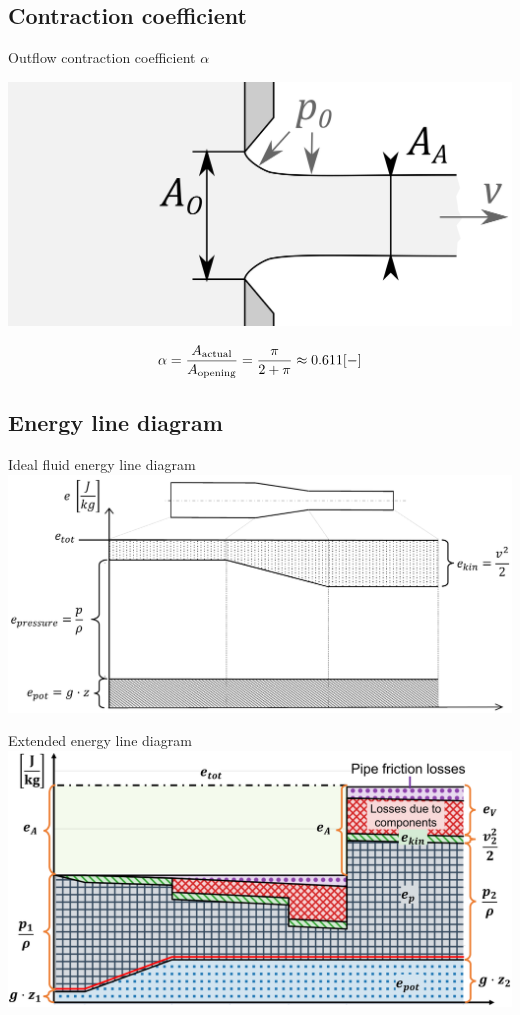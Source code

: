 \documentclass{article}
\begin{document}
\begin{multicols}{2}
\subsection{Contraction coefficient}
\begin{theorybox}{Outflow contraction coefficient $\alpha$}
    \begin{center}
        \includegraphics[width=.75\textwidth]{media/contraction.png}
    \end{center}
    \begin{equation}
        \alpha = \dfrac{A_{\rm actual}}{A_{\rm opening}} = \dfrac{\pi}{2 + \pi} \approx 0.611 [-]
    \end{equation}
\end{theorybox}

\subsection{Energy line diagram}
\begin{theorybox}{Ideal fluid energy line diagram}
    \includegraphics[width=\textwidth]{media/EGL_Duese_EN.PNG}
\end{theorybox}

\begin{theorybox}{Extended energy line diagram}
    \includegraphics[width=\textwidth]{media/04_energyLineDiagram_vGB.png}
\end{theorybox}

\vfill
\end{multicols}
\end{document}
